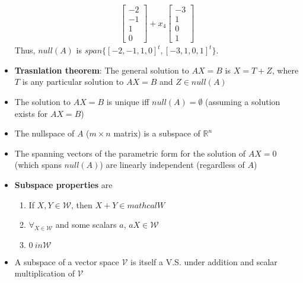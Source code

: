 \begin{itemize}
\begin{align*}
\begin{bmatrix}
        -2\\ -1\\ 1\\ 0
      \end{bmatrix}
      +
      x_4 \begin{bmatrix}
        -3\\ 1\\ 0\\ 1
      \end{bmatrix}
    \end{align*}
    Thus, $null(A)$ is $span\{ [ -2, -1, 1, 0]^t, [-3, 1, 0, 1]^t \}$.
  \item \textbf{Trasnlation theorem}: The general solution to $AX = B$ is $X = T + Z$, where $T$ is any particular solution to $AX = B$ and $Z \in null(A)$
  \item The solution to $AX = B$ is unique iff $null(A) = \emptyset$ (assuming a solution exists for $AX = B$)
  \item The nullspace of $A$ ($m \times n$ matrix) is a subspace of $\mathbb{R}^n$
  \item The spanning vectors of the parametric form for the solution of $AX= 0$ (which spans $null(A)$) are linearly independent (regardless of $A$)
  \item \textbf{Subspace properties} are
    \begin{enumerate}[label={\arabic*)}]
      \item If $X, Y \in \mathcal{W}$, then $X + Y \in mathcal{W}$
      \item $\forall_{X \in \mathcal{W}}$ and some scalars $a$, $aX \in \mathcal{W}$
      \item $0\ in \mathcal{W}$
    \end{enumerate}
  \item A subspace of a vector space $\mathcal{V}$ is itself a V.S. under addition and scalar multiplication of $\mathcal{V}$
\end{itemize}

